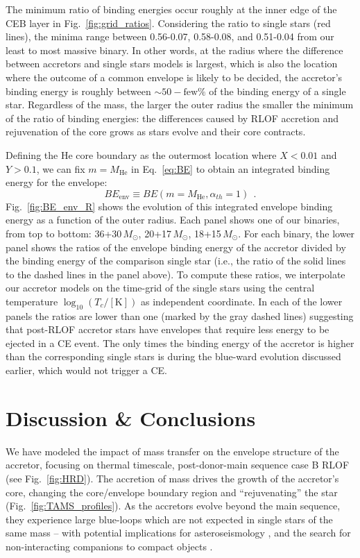 \documentclass[twocolumn,twocolappendix,trackchanges]{aastex63}
\DeclareRobustCommand{\Eqref}[1]{Eq.~\ref{#1}}
\DeclareRobustCommand{\Figref}[1]{Fig.~\ref{#1}}
\begin{document}
The minimum ratio of binding energies occur roughly at the inner edge
of the CEB layer in \Figref{fig:grid_ratios}. Considering the
ratio to single stars (red lines), the minima range between 0.56-0.07,
0.58-0.08, and 0.51-0.04 from our least to most massive binary. In
other words, at the radius where the difference between accretors and
single stars models is largest, which is also the location where the
outcome of a common envelope is likely to be decided, the accretor's
binding energy is roughly between $\sim{}50-\mathrm{few}\%$ of the
binding energy of a single star. Regardless of the mass, the larger
the outer radius the smaller the minimum of the ratio of binding
energies: the differences caused by RLOF accretion and rejuvenation of
the core grows as stars evolve and their core contracts.


Defining the He core boundary as the outermost location where $X<0.01$
and $Y>0.1$, we can fix $m=M_\mathrm{He}$ in \Eqref{eq:BE} to obtain
an integrated binding energy for the envelope:
\begin{equation}
  \label{eq:BE_env}
  BE_\mathrm{env} \equiv BE(m=M_\mathrm{He}, \alpha_{th}=1) \ \ .
\end{equation}
\Figref{fig:BE_env_R} shows the evolution of this integrated envelope
binding energy as a function of the outer radius. Each panel shows one
of our binaries, from top to bottom: 36+30\,$M_\odot$,
20+17\,$M_\odot$, 18+15\,$M_\odot$.  For each binary, the
lower panel shows the ratios of the envelope binding energy of the
accretor divided by the binding energy of the comparison single star
(i.e., the ratio of the solid lines to the dashed lines in the panel
above). To compute these ratios, we interpolate our accretor models
on the time-grid of the single stars using the central temperature
$\log_{10}(T_c/[\mathrm{K}])$ as independent coordinate. In each of
the lower panels the ratios are lower than one (marked by the gray
dashed lines) suggesting that post-RLOF
accretor stars have envelopes that require less energy to be
ejected in a CE event. The only times the binding energy of the
accretor is higher than the corresponding single stars is during the
blue-ward evolution discussed earlier, which would not trigger a CE.

\section{Discussion \& Conclusions}
\label{sec:conclusions}

We have modeled the impact of mass transfer on the envelope structure
of the accretor, focusing on thermal timescale, post-donor-main
sequence case B RLOF (see \Figref{fig:HRD}). The accretion of mass
drives the growth of the accretor's core, changing the core/envelope
boundary region and ``rejuvenating'' the star (\Figref{fig:TAMS_profiles}). As the accretors evolve
beyond the main sequence, they experience large blue-loops which are
not expected in single stars of the same mass -- with potential
implications for asteroseismology \citep[e.g.,][]{dorn-wallenstein:20},
and the search for non-interacting companions to compact objects
\citep[e.g.,][]{breivik:17, andrews:19, chawla:21}.
\end{document}
